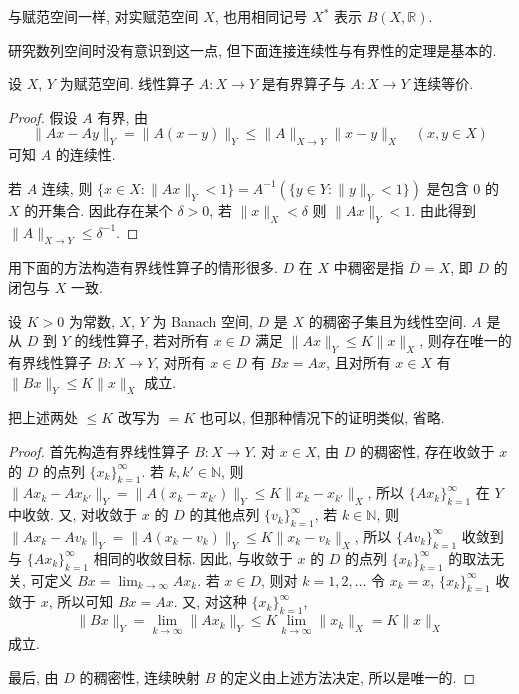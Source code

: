 与赋范空间一样, 对实赋范空间 $X$, 也用相同记号 $X^{*}$ 表示 $B(X, \mathbb{R})$.

研究数列空间时没有意识到这一点, 但下面连接连续性与有界性的定理是基本的.

\begin{theorem}\label{thm:2.22}
设 $X$, $Y$ 为赋范空间. 线性算子 $A: X \to Y$ 是有界算子与 $A: X \to Y$ 连续等价.
\end{theorem}

\begin{proof}
假设 $A$ 有界, 由
\[
\|Ax - Ay\|_{Y} = \|A(x - y)\|_{Y} \leq \|A\|_{X \to Y}\|x - y\|_{X} \quad (x, y \in X)
\]
可知 $A$ 的连续性.

若 $A$ 连续, 则 $\{x \in X : \|Ax\|_{Y} < 1\} = A^{-1}(\{y \in Y : \|y\|_{Y} < 1\})$ 是包含 $0$ 的 $X$ 的开集合. 因此存在某个 $\delta > 0$, 若 $\|x\|_{X} < \delta$ 则 $\|Ax\|_{Y} < 1$. 由此得到 $\|A\|_{X \to Y} \leq \delta^{-1}$.
\end{proof}

用下面的方法构造有界线性算子的情形很多. $D$ 在 $X$ 中稠密是指 $\overline{D} = X$, 即 $D$ 的闭包与 $X$ 一致.

\begin{theorem}\label{thm:2.23}
设 $K > 0$ 为常数, $X$, $Y$ 为 Banach 空间, $D$ 是 $X$ 的稠密子集且为线性空间. $A$ 是从 $D$ 到 $Y$ 的线性算子, 若对所有 $x \in D$ 满足 $\|Ax\|_{Y} \leq K\|x\|_{X}$, 则存在唯一的有界线性算子 $B: X \to Y$, 对所有 $x \in D$ 有 $Bx = Ax$, 且对所有 $x \in X$ 有 $\|Bx\|_{Y} \leq K\|x\|_{X}$ 成立.
\end{theorem}

把上述两处 $\leq K$ 改写为 $= K$ 也可以, 但那种情况下的证明类似, 省略.

\begin{proof}
首先构造有界线性算子 $B: X \to Y$. 对 $x \in X$, 由 $D$ 的稠密性, 存在收敛于 $x$ 的 $D$ 的点列 $\{x_{k}\}_{k=1}^{\infty}$. 若 $k, k' \in \mathbb{N}$, 则 $\|Ax_{k} - Ax_{k'}\|_{Y} = \|A(x_{k} - x_{k'})\|_{Y} \leq K\|x_{k} - x_{k'}\|_{X}$, 所以 $\{Ax_{k}\}_{k=1}^{\infty}$ 在 $Y$ 中收敛. 又, 对收敛于 $x$ 的 $D$ 的其他点列 $\{v_{k}\}_{k=1}^{\infty}$, 若 $k \in \mathbb{N}$, 则 $\|Ax_{k} - Av_{k}\|_{Y} = \|A(x_{k} - v_{k})\|_{Y} \leq K\|x_{k} - v_{k}\|_{X}$, 所以 $\{Av_{k}\}_{k=1}^{\infty}$ 收敛到与 $\{Ax_{k}\}_{k=1}^{\infty}$ 相同的收敛目标. 因此, 与收敛于 $x$ 的 $D$ 的点列 $\{x_{k}\}_{k=1}^{\infty}$ 的取法无关, 可定义 $Bx = \lim_{k \to \infty}Ax_{k}$. 若 $x \in D$, 则对 $k = 1, 2, \ldots$ 令 $x_{k} = x$, $\{x_{k}\}_{k=1}^{\infty}$ 收敛于 $x$, 所以可知 $Bx = Ax$. 又, 对这种 $\{x_{k}\}_{k=1}^{\infty}$,
\[
\|Bx\|_{Y} = \lim_{k \to \infty}\|Ax_{k}\|_{Y} \leq K\lim_{k \to \infty}\|x_{k}\|_{X} = K\|x\|_{X}
\]
成立.

最后, 由 $D$ 的稠密性, 连续映射 $B$ 的定义由上述方法决定, 所以是唯一的.
\end{proof}

